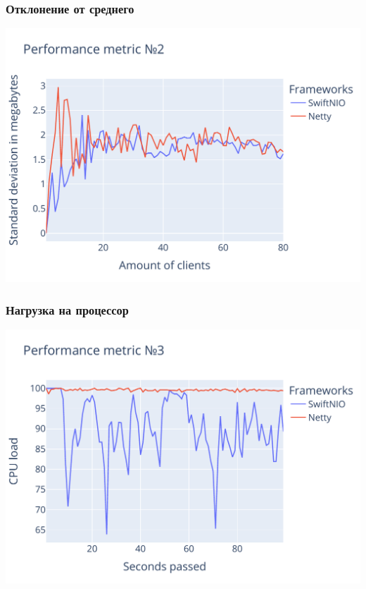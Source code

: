 \documentclass[10pt,xcolor={table,dvipsnames},t]{beamer}
\begin{document}
\begin{frame}
\frametitle{Отклонение от среднего}

\begin{center}
    \includegraphics[width=.65\textwidth,height=.65\textheight]{metric2_final.pdf}
\end{center}
\end{frame}

\begin{frame}
\frametitle{Нагрузка на процессор}

\begin{center}
    \includegraphics[width=.65\textwidth,height=.65\textheight]{metric3_final.pdf}
\end{center}
\end{frame}

\normalframetitle
\end{document}
